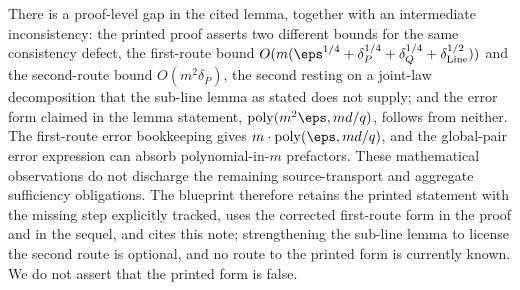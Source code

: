 \documentclass[11pt]{article}
\DeclareMathOperator{\poly}{poly}
\begin{document}
There is a proof-level gap in the cited lemma, together with an
intermediate inconsistency: the printed proof asserts two different
bounds for the same consistency defect, the first-route bound
$O(m(\eps^{1/4} + \delta_P^{1/4} + \delta_Q^{1/4} +
\delta_{\mathrm{Line}}^{1/2}))$ and the second-route bound
$O(m^2\delta_P)$, the second resting on a joint-law decomposition that
the sub-line lemma as stated does not supply; and the error form claimed
in the lemma statement, $\poly(m^2\eps, md/q)$, follows from neither.
The first-route error bookkeeping gives $m \cdot \poly(\eps, md/q)$,
and the global-pair error expression can absorb polynomial-in-$m$
prefactors. These mathematical observations do not discharge the remaining
source-transport and aggregate sufficiency obligations. The blueprint therefore
retains the printed statement with the missing step explicitly tracked, uses
the corrected first-route form in the proof and in the sequel, and cites this
note; strengthening the sub-line lemma to license the second route is
optional, and no route to the printed form is currently known.  We do not
assert that the printed form is false.



\end{document}
